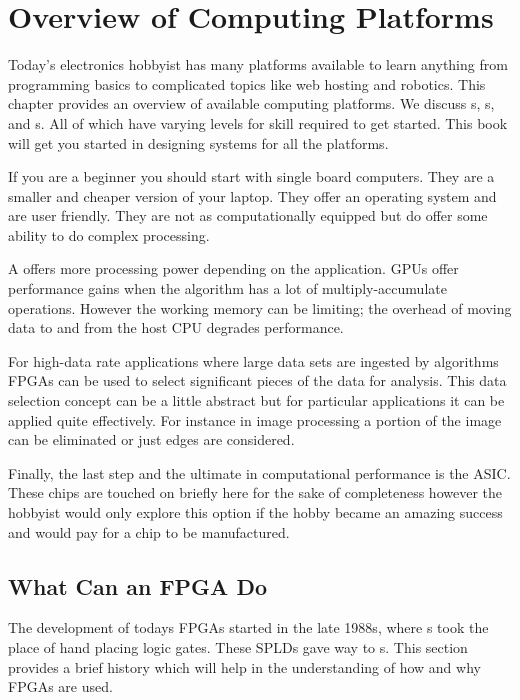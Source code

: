 \chapter{Overview of Computing Platforms}
Today's electronics hobbyist has many platforms available to learn anything from programming basics to complicated topics like web hosting and robotics. This chapter provides an overview  of available computing platforms. We discuss s, s, and s. All of which have varying levels for skill required to get started. This book will get you started in designing systems for all the platforms.  

If you are a beginner you should start with single board computers. They are a smaller and cheaper version of your laptop. They offer an operating system and are user friendly. They are not as computationally equipped but do offer some ability to do complex processing. 

A  offers more processing power depending on the application. \ac{GPU}s offer performance gains when the algorithm has a lot of multiply-accumulate operations. However the working memory can be limiting; the overhead of moving data to and from the host \ac{CPU} degrades performance.

For high-data rate applications where large data sets are ingested by algorithms \ac{FPGA}s can be used to select significant pieces of the data for analysis. This data selection concept can be a little abstract but for particular applications it can be applied quite effectively. For instance in image processing a portion of the image can be eliminated or just edges are considered. 

Finally, the last step and the ultimate in computational performance is the \ac{ASIC}. These chips are touched on briefly here for the sake of completeness however the hobbyist would only explore this option if the hobby became an amazing success and would pay for a chip to be manufactured. 
	
	
\section{What Can an FPGA Do}

The development of todays \ac{FPGA}s started in the late 1988s, where s took the place of hand placing logic gates. These \ac{SPLD}s gave way to s. This section provides a brief history which will help in the understanding of how and why \ac{FPGA}s are used.  	

